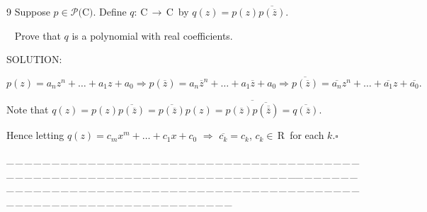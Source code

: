 \documentclass[a4paper, 11pt, UTF8]{article}
\def\Po{\mathcal{P}}
\def\Cbf{$\,{\timesbf C}\,$}
\def\Rbfc{$\,{\timesbf R}$}
\def\Cbfc{$\,{\timesbf C}$}
\begin{document}
\begin{large}
{\timesbf\Large 9} {\timessl\Large 
Suppose $p\in\Po(${\timesbf C}$)$. Define $q:\Cbf\rightarrow\Cbfc\,$ by $q(z) = p(z)\overline{p(\overline z)}$.}\par\,\,\,
{\timessl\Large Prove that $q$ is a polynomial with real coefficients.
}\par
{\timesbf S\footnotesize{OLUTION:}}\par\quad
$p(z)=a_n z^n+\dots+a_1 z+a_0\Rightarrow p(\overline z)=a_n \overline z^n+\dots+a_1 \overline z+a_0\Rightarrow \overline{p(\overline z)}=\overline{a_n}z^n+\dots+\overline{a_1}z+\overline{a_0}.$\par\quad
Note that $q(z)=p(z)\overline{p(\overline z)}=\overline{p(\overline z)}p(z)=\overline{p(\overline z)\overline{p(\overline{\overline z})}}=\overline{q(\overline z)}.$\par\quad
Hence letting $q(z)=c_m x^m+\dots+c_1 x+c_0\,\,\Rightarrow\,\,\overline{c_k}=c_k$, $c_k\in\Rbfc\,$ for each $k$.\quad$\square$\par
{\tiny \_\,\_\,\_\,\_\,\_\,\_\,\_\,\_\,\_\,\_\,\_\,\_\,\_\,\_\,\_\,\_\,\_\,\_\,\_\,\_\,\_\,\_\,\_\,\_\,\_\,\_\,\_\,\_\,\_\,\_\,\_\,\_\,\_\,\_\,\_\,\_\,\_\,\_\,\_\,\_\,\_\,\_\,\_\,\_\,\_\,\_\,\_\,\_\,\_\,\_\,\_\,\_\,\_\,\_\,\_\,\_\,\_\,\_\,\_\,\_\,\_\,\_\,\_\,\_\,\_\,\_\,\_\,\_\,\_\,\_\,\_\_\,\_\,\_\,\_\,\_\,\_\,\_\,\_\,\_\,\_\,\_\,\_\,\_\,\_\,\_\,\_\,\_\,\_\,\_\,\_\,\_\,\_\,\_\,\_\,\_\,\_\,\_\,\_\,\_\,\_\,\_\,\_\,\_\,\_\,\_\,\_\,\_\,\_\,\_\,\_\,\_\,\_\,\_\,\_\,\_\,\_\,\_\,\_\,\_\,\_\,\_\,\_\,\_\,\_\,\_\,\_\,\_\,\_\,\_\,\_\,\_\,\_\,\_\,\_\,\_\,\_\,\_\,\_\,\_\,\_\,\_}\par


\end{large}
\end{document}

